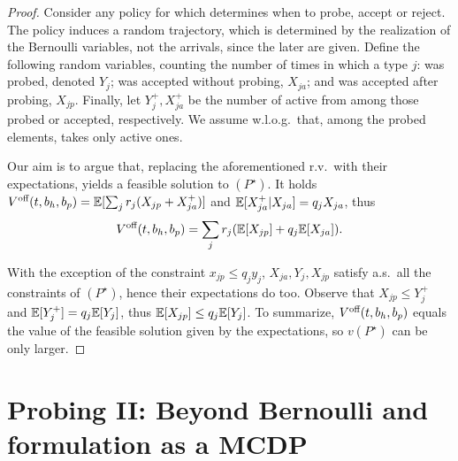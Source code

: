 \documentclass[letterpaper,11pt]{article}
\begin{document}
\begin{proof}
Consider any policy for \off which determines when to probe, accept or reject.
The policy induces a random trajectory, which is determined by the realization of the Bernoulli variables, not the arrivals, since the later are given.
Define the following random variables, counting the number of times in which a type $j$: was probed, denoted $Y_j$; was accepted without probing, $X_{ja}$; and was accepted after probing, $X_{jp}$.
Finally, let $Y_{j}^+,X_{ja}^+$ be the number of active from among those probed or accepted, respectively.
We assume w.l.o.g.\ that, among the probed elements, \off takes only active ones.

Our aim is to argue that, replacing the aforementioned r.v.\ with their expectations, yields a feasible solution to $(P^\star)$.
It holds $V^{\text{off}}(t,b_h,b_p) = \mathbb{E}[\sum_j r_j(X_{jp}+X_{ja}^+)]$ and $\mathbb{E}[X_{ja}^+|X_{ja}]=q_jX_{ja}$, thus
\[
V^{\text{off}}(t,b_h,b_p) = \sum_jr_j(\mathbb{E}[X_{jp}]+q_j\mathbb{E}[X_{ja}]).
\] 

With the exception of the constraint $x_{jp}\leq q_jy_j$, $X_{ja},Y_j,X_{jp}$ satisfy a.s.\ all the constraints of $(P^\star)$, hence their expectations do too.
Observe that $X_{jp}\leq Y_{j}^+$ and $\mathbb{E}[Y_j^+]=q_j\mathbb{E}[Y_j]$, thus $\mathbb{E}[X_{jp}]\leq q_j\mathbb{E}[Y_j]$.
To summarize, $V^{\text{off}}(t,b_h,b_p)$ equals the value of the feasible solution given by the expectations, so $v(P^\star)$ can be only larger.
\end{proof}

\section{Probing II: Beyond Bernoulli and formulation as a MCDP}
\end{document}
